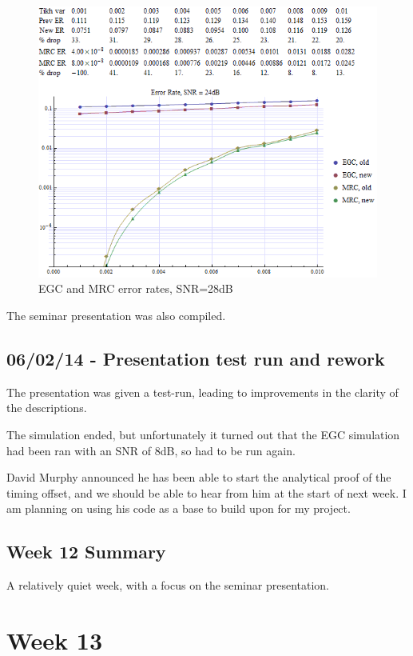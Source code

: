 \begin{figure}[htbp]
\centering
\includegraphics[width=\linewidth]{../../../plots/egc_mrc_28db.png}
\caption{EGC and MRC error rates, SNR=28dB}
\end{figure}

The seminar presentation was also compiled.

\subsection{06/02/14 - Presentation test run and rework}

The presentation was given a test-run, leading to improvements in the
clarity of the descriptions.

The simulation ended, but unfortunately it turned out that the EGC
simulation had been ran with an SNR of 8dB, so had to be run again.

David Murphy announced he has been able to start the analytical proof of the
timing offset, and we should be able to hear from him at the start of
next week. I am planning on using his code as a base to build upon for my project.

\subsection{Week 12 Summary}

A relatively quiet week, with a focus on the seminar presentation.

\section{Week 13}

